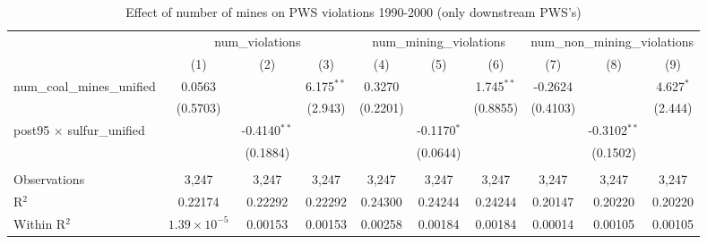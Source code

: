 
\begin{table}[htbp]
   \caption{\label{olsrf2sls_nummine_count_vio_1990to2000dwnstrm_coalunified} Effect of number of mines on PWS violations 1990-2000 (only downstream PWS's)}
   \bigskip
   \centering
   \begin{adjustbox}{width = \textwidth, center}
      \begin{tabular}{lccccccccc}
         \toprule
          & \multicolumn{3}{c}{num\_violations} & \multicolumn{3}{c}{num\_mining\_violations} & \multicolumn{3}{c}{num\_non\_mining\_violations}\\
                                                          & (1)                   & (2)            & (3)           & (4)           & (5)           & (6)           & (7)           & (8)            & (9)\\  
         \midrule 
         num\_coal\_mines\_unified                        & 0.0563                &                & 6.175$^{**}$  & 0.3270        &               & 1.745$^{**}$  & -0.2624       &                & 4.627$^{*}$\\   
                                                          & (0.5703)              &                & (2.943)       & (0.2201)      &               & (0.8855)      & (0.4103)      &                & (2.444)\\   
         post95 $\times$ sulfur\_unified                  &                       & -0.4140$^{**}$ &               &               & -0.1170$^{*}$ &               &               & -0.3102$^{**}$ &   \\   
                                                          &                       & (0.1884)       &               &               & (0.0644)      &               &               & (0.1502)       &   \\   
          \\
         Observations                                     & 3,247                 & 3,247          & 3,247         & 3,247         & 3,247         & 3,247         & 3,247         & 3,247          & 3,247\\  
         R$^2$                                            & 0.22174               & 0.22292        & 0.22292       & 0.24300       & 0.24244       & 0.24244       & 0.20147       & 0.20220        & 0.20220\\  
         Within R$^2$                                     & $1.39\times 10^{-5}$  & 0.00153        & 0.00153       & 0.00258       & 0.00184       & 0.00184       & 0.00014       & 0.00105        & 0.00105\\  

\end{tabular}
\end{adjustbox}
\end{table}
